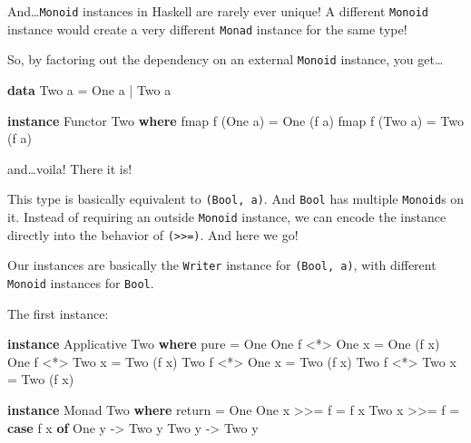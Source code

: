 \documentclass[]{article}
\newenvironment{Shaded}{\begin{snugshade}}{\end{snugshade}}
\newcommand{\DataTypeTok}[1]{\textcolor[rgb]{0.13,0.29,0.53}{#1}}
\newcommand{\FunctionTok}[1]{\textcolor[rgb]{0.00,0.00,0.00}{#1}}
\newcommand{\KeywordTok}[1]{\textcolor[rgb]{0.13,0.29,0.53}{\textbf{#1}}}
\newcommand{\NormalTok}[1]{#1}
\newcommand{\OtherTok}[1]{\textcolor[rgb]{0.56,0.35,0.01}{#1}}
\begin{document}
And\ldots{}\texttt{Monoid} instances in Haskell are rarely ever unique! A
different \texttt{Monoid} instance would create a very different \texttt{Monad}
instance for the same type!

So, by factoring out the dependency on an external \texttt{Monoid} instance, you
get\ldots{}

\begin{Shaded}
\begin{Highlighting}[]
\KeywordTok{data} \DataTypeTok{Two}\NormalTok{ a }\FunctionTok{=} \DataTypeTok{One}\NormalTok{ a }\FunctionTok{|} \DataTypeTok{Two}\NormalTok{ a}

\KeywordTok{instance} \DataTypeTok{Functor} \DataTypeTok{Two} \KeywordTok{where}
\NormalTok{    fmap f (}\DataTypeTok{One}\NormalTok{ a) }\FunctionTok{=} \DataTypeTok{One}\NormalTok{ (f a)}
\NormalTok{    fmap f (}\DataTypeTok{Two}\NormalTok{ a) }\FunctionTok{=} \DataTypeTok{Two}\NormalTok{ (f a)}
\end{Highlighting}
\end{Shaded}

and\ldots{}voila! There it is!

This type is basically equivalent to \texttt{(Bool,\ a)}. And \texttt{Bool} has
multiple \texttt{Monoid}s on it. Instead of requiring an outside \texttt{Monoid}
instance, we can encode the instance directly into the behavior of
\texttt{(\textgreater{}\textgreater{}=)}. And here we go!

Our instances are basically the \texttt{Writer} instance for
\texttt{(Bool,\ a)}, with different \texttt{Monoid} instances for \texttt{Bool}.

The first instance:

\begin{Shaded}
\begin{Highlighting}[]
\KeywordTok{instance} \DataTypeTok{Applicative} \DataTypeTok{Two} \KeywordTok{where}
\NormalTok{    pure }\FunctionTok{=} \DataTypeTok{One}
    \DataTypeTok{One}\NormalTok{ f }\FunctionTok{<*>} \DataTypeTok{One}\NormalTok{ x }\FunctionTok{=} \DataTypeTok{One}\NormalTok{ (f x)}
    \DataTypeTok{One}\NormalTok{ f }\FunctionTok{<*>} \DataTypeTok{Two}\NormalTok{ x }\FunctionTok{=} \DataTypeTok{Two}\NormalTok{ (f x)}
    \DataTypeTok{Two}\NormalTok{ f }\FunctionTok{<*>} \DataTypeTok{One}\NormalTok{ x }\FunctionTok{=} \DataTypeTok{Two}\NormalTok{ (f x)}
    \DataTypeTok{Two}\NormalTok{ f }\FunctionTok{<*>} \DataTypeTok{Two}\NormalTok{ x }\FunctionTok{=} \DataTypeTok{Two}\NormalTok{ (f x)}

\KeywordTok{instance} \DataTypeTok{Monad} \DataTypeTok{Two} \KeywordTok{where}
\NormalTok{    return }\FunctionTok{=} \DataTypeTok{One}
    \DataTypeTok{One}\NormalTok{ x }\FunctionTok{>>=}\NormalTok{ f }\FunctionTok{=}\NormalTok{ f x}
    \DataTypeTok{Two}\NormalTok{ x }\FunctionTok{>>=}\NormalTok{ f }\FunctionTok{=} \KeywordTok{case}\NormalTok{ f x }\KeywordTok{of}
                    \DataTypeTok{One}\NormalTok{ y }\OtherTok{->} \DataTypeTok{Two}\NormalTok{ y}
                    \DataTypeTok{Two}\NormalTok{ y }\OtherTok{->} \DataTypeTok{Two}\NormalTok{ y}
\end{Highlighting}
\end{Shaded}
\end{document}
